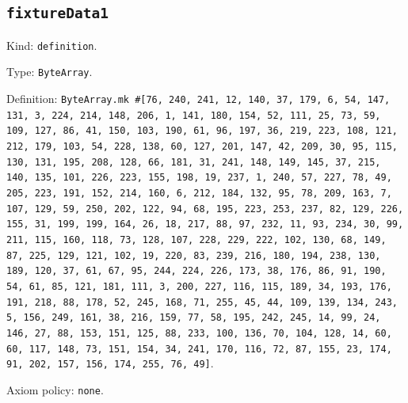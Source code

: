 \documentclass[11pt]{article}
\begin{document}
\subsection*{\texttt{fixtureData1}}
\noindent Kind: \texttt{definition}.\par
\noindent Type: \texttt{ByteArray}.\par
\noindent Definition: \texttt{ByteArray.mk \#[76, 240, 241, 12, 140, 37, 179, 6, 54, 147, 131, 3, 224, 214, 148, 206, 1, 141, 180, 154, 52, 111, 25, 73, 59, 109, 127, 86, 41, 150, 103, 190, 61, 96, 197, 36, 219, 223, 108, 121, 212, 179, 103, 54, 228, 138, 60, 127, 201, 147, 42, 209, 30, 95, 115, 130, 131, 195, 208, 128, 66, 181, 31, 241, 148, 149, 145, 37, 215, 140, 135, 101, 226, 223, 155, 198, 19, 237, 1, 240, 57, 227, 78, 49, 205, 223, 191, 152, 214, 160, 6, 212, 184, 132, 95, 78, 209, 163, 7, 107, 129, 59, 250, 202, 122, 94, 68, 195, 223, 253, 237, 82, 129, 226, 155, 31, 199, 199, 164, 26, 18, 217, 88, 97, 232, 11, 93, 234, 30, 99, 211, 115, 160, 118, 73, 128, 107, 228, 229, 222, 102, 130, 68, 149, 87, 225, 129, 121, 102, 19, 220, 83, 239, 216, 180, 194, 238, 130, 189, 120, 37, 61, 67, 95, 244, 224, 226, 173, 38, 176, 86, 91, 190, 54, 61, 85, 121, 181, 111, 3, 200, 227, 116, 115, 189, 34, 193, 176, 191, 218, 88, 178, 52, 245, 168, 71, 255, 45, 44, 109, 139, 134, 243, 5, 156, 249, 161, 38, 216, 159, 77, 58, 195, 242, 245, 14, 99, 24, 146, 27, 88, 153, 151, 125, 88, 233, 100, 136, 70, 104, 128, 14, 60, 60, 117, 148, 73, 151, 154, 34, 241, 170, 116, 72, 87, 155, 23, 174, 91, 202, 157, 156, 174, 255, 76, 49]}.\par
\noindent Axiom policy: \texttt{none}.\par
\end{document}
